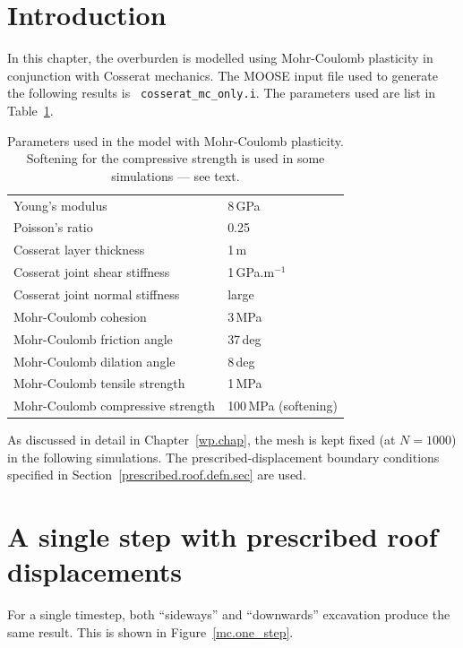 \documentclass[]{scrreprt}
\begin{document}
\section{Introduction}
In this chapter, the overburden is modelled using Mohr-Coulomb
plasticity in conjunction with Cosserat mechanics.  The MOOSE input
file used to generate the following results is {\tt
  cosserat\_mc\_only.i}.  The parameters
used are list in Table~\ref{mc.params.tab}.

\begin{table}[htb]
\begin{center}
\begin{tabular}{ll}
Young's modulus & 8\,GPa \\
Poisson's ratio & 0.25 \\
Cosserat layer thickness & 1\,m \\
Cosserat joint shear stiffness & 1\,GPa.m$^{-1}$ \\
Cosserat joint normal stiffness & large \\
Mohr-Coulomb cohesion & 3\,MPa \\
Mohr-Coulomb friction angle & 37\,deg \\
Mohr-Coulomb dilation angle & 8\,deg \\
Mohr-Coulomb tensile strength & 1\,MPa \\
Mohr-Coulomb compressive strength & 100\,MPa (softening)
\end{tabular}
\caption{Parameters used in the model with Mohr-Coulomb plasticity.
  Softening for the compressive strength is used in some simulations
  --- see text.}
\label{mc.params.tab}
\end{center}
\end{table}

As discussed in detail in Chapter~\ref{wp.chap}, the mesh is kept
fixed (at $N=1000$) in the following simulations.   The
prescribed-displacement boundary conditions specified in
Section~\ref{prescribed.roof.defn.sec} are used.

\section{A single step with prescribed roof displacements}

For a single timestep, both ``sideways'' and ``downwards'' excavation
produce the same result.  This is shown in Figure~\ref{mc.one_step}.
\end{document}
